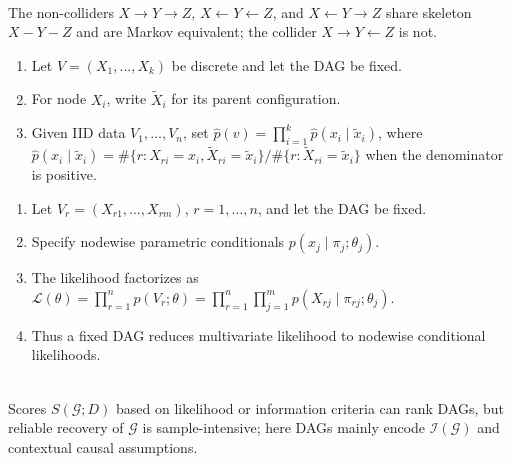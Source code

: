 \begin{example} \label{ex:three-node-markov-equivalence} \\
The non-colliders $X\to Y\to Z$, $X\leftarrow Y\leftarrow Z$, and $X\leftarrow Y\to Z$ share skeleton $X-Y-Z$ and are Markov equivalent; the collider $X\to Y\leftarrow Z$ is not.
\end{example}

\begin{method} \label{meth:discrete-dag-maximum-likelihood} 
\begin{enumerate}[label=(\roman*)]
\setlength{\itemsep}{0pt}
\item Let $V=(X_1,\ldots,X_k)$ be discrete and let the DAG be fixed.
\item For node $X_i$, write $\widetilde X_i$ for its parent configuration.
\item Given IID data $V_1,\ldots,V_n$, set $\widehat p(v)=\prod_{i=1}^{k}\widehat p(x_i\mid \widetilde x_i)$, where\\
$\widehat p(x_i\mid \widetilde x_i)=\#\{r:X_{ri}=x_i,\widetilde X_{ri}=\widetilde x_i\}/\#\{r:\widetilde X_{ri}=\widetilde x_i\}$ when the denominator is positive.
\end{enumerate}
\end{method}

\begin{method} \label{meth:parametric-continuous-dag-likelihood} 
\begin{enumerate}[label=(\roman*)]
\setlength{\itemsep}{0pt}
\item Let $V_r=(X_{r1},\ldots,X_{rm})$, $r=1,\ldots,n$, and let the DAG be fixed.
\item Specify nodewise parametric conditionals $p(x_j\mid \pi_j;\theta_j)$.
\item The likelihood factorizes as $\mathcal{L}(\theta)=\prod_{r=1}^{n}p(V_r;\theta)=\prod_{r=1}^{n}\prod_{j=1}^{m}p(X_{rj}\mid \pi_{rj};\theta_j)$.
\item Thus a fixed DAG reduces multivariate likelihood to nodewise conditional likelihoods.
\end{enumerate}
\end{method}

\begin{remark} \label{rem:dag-structure-learning-caution} \\
Scores $S(\mathcal{G};D)$ based on likelihood or information criteria can rank DAGs, but reliable recovery of $\mathcal{G}$ is sample-intensive; here DAGs mainly encode $\mathcal{I}(\mathcal{G})$ and contextual causal assumptions.
\end{remark}

